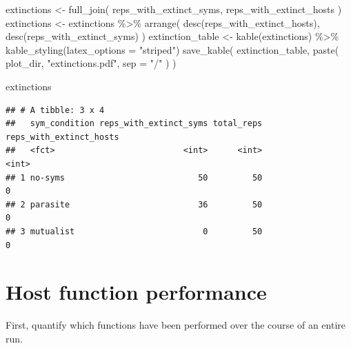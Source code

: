 \documentclass[
]{book}
\newenvironment{Shaded}{\begin{snugshade}}{\end{snugshade}}
\newcommand{\AttributeTok}[1]{\textcolor[rgb]{0.77,0.63,0.00}{#1}}
\newcommand{\FunctionTok}[1]{\textcolor[rgb]{0.00,0.00,0.00}{#1}}
\newcommand{\NormalTok}[1]{#1}
\newcommand{\OtherTok}[1]{\textcolor[rgb]{0.56,0.35,0.01}{#1}}
\newcommand{\SpecialCharTok}[1]{\textcolor[rgb]{0.00,0.00,0.00}{#1}}
\newcommand{\StringTok}[1]{\textcolor[rgb]{0.31,0.60,0.02}{#1}}
\begin{document}
\begin{Shaded}
\begin{Highlighting}[]
\NormalTok{extinctions }\OtherTok{\textless{}{-}} \FunctionTok{full\_join}\NormalTok{(}
\NormalTok{  reps\_with\_extinct\_syms,}
\NormalTok{  reps\_with\_extinct\_hosts}
\NormalTok{)}
\NormalTok{extinctions }\OtherTok{\textless{}{-}}\NormalTok{ extinctions }\SpecialCharTok{\%\textgreater{}\%}
  \FunctionTok{arrange}\NormalTok{(}
    \FunctionTok{desc}\NormalTok{(reps\_with\_extinct\_hosts), }\FunctionTok{desc}\NormalTok{(reps\_with\_extinct\_syms)}
\NormalTok{  )}
\NormalTok{extinction\_table }\OtherTok{\textless{}{-}} \FunctionTok{kable}\NormalTok{(extinctions) }\SpecialCharTok{\%\textgreater{}\%}
  \FunctionTok{kable\_styling}\NormalTok{(}\AttributeTok{latex\_options =} \StringTok{"striped"}\NormalTok{)}
\FunctionTok{save\_kable}\NormalTok{(}
\NormalTok{  extinction\_table,}
  \FunctionTok{paste}\NormalTok{(}
\NormalTok{    plot\_dir,}
    \StringTok{"extinctions.pdf"}\NormalTok{,}
    \AttributeTok{sep =} \StringTok{"/"}
\NormalTok{  )}
\NormalTok{)}

\NormalTok{extinctions}
\end{Highlighting}
\end{Shaded}

\begin{verbatim}
## # A tibble: 3 x 4
##   sym_condition reps_with_extinct_syms total_reps reps_with_extinct_hosts
##   <fct>                          <int>      <int>                   <int>
## 1 no-syms                           50         50                       0
## 2 parasite                          36         50                       0
## 3 mutualist                          0         50                       0
\end{verbatim}

\hypertarget{host-function-performance-1}{%
\section{Host function performance}\label{host-function-performance-1}}

First, quantify which functions have been performed over the course of an entire run.
\end{document}
